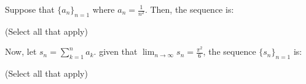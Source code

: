 \documentclass{ximera}
\author{Jim Talamo}
\begin{document}
\begin{exercise}
Suppose that $\{a_n \}_{n=1}$ where $a_n = \frac{1}{n^2}$.  Then, the sequence is:

\begin{selectAll}
\end{selectAll}
(Select all that apply)

Now, let $s_n = \sum_{k=1}^{n} a_k$.  given that $\lim_{n \to \infty} s_n = \frac{\pi^2}{6}$, the sequence $\{s_n \}_{n=1}$ is:
\begin{selectAll}
\end{selectAll}
(Select all that apply)

\end{exercise}
\end{document}
